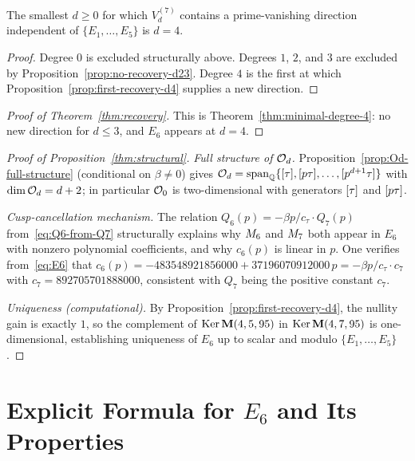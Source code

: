 \documentclass[11pt]{article}
\begin{document}
\begin{theorem}
\label{thm:minimal-degree-4}
The smallest $d\ge 0$ for which $V_d^{(7)}$ contains a prime-vanishing direction
independent of $\{E_1,\dots,E_5\}$ is $d=4$.
\end{theorem}

\begin{proof}
Degree $0$ is excluded structurally above.
Degrees $1$, $2$, and $3$ are excluded by Proposition~\ref{prop:no-recovery-d23}.
Degree $4$ is the first at which Proposition~\ref{prop:first-recovery-d4} supplies
a new direction.
\end{proof}

\begin{proof}[Proof of Theorem~\ref{thm:recovery}]
This is Theorem~\ref{thm:minimal-degree-4}: no new direction for $d\le 3$, and $E_6$
appears at $d=4$.
\end{proof}

\begin{proof}[Proof of Proposition~\ref{thm:structural}]
\textit{Full structure of $\mathcal{O}_d$.}
Proposition~\ref{prop:Od-full-structure} (conditional on $\beta\ne 0$) gives
$\mathcal{O}_d=\operatorname{span}_{\mathbb{Q}}\{[\tau],[p\tau],\dots,[p^{d+1}\tau]\}$ with $\dim\mathcal{O}_d=d+2$;
in particular $\mathcal{O}_0$ is two-dimensional with generators $[\tau]$ and $[p\tau]$.

\textit{Cusp-cancellation mechanism.}
The relation $Q_6(p) = -\beta p/c_\tau\cdot Q_7(p)$ from~\eqref{eq:Q6-from-Q7}
structurally explains why $M_{6}$ and $M_{7}$ both appear in $E_6$ with nonzero
polynomial coefficients, and why $c_6(p)$ is linear in $p$.
One verifies from~\eqref{eq:E6} that
$c_6(p) = -483548921856000 + 37196070912000\,p = -\beta p/c_\tau\cdot c_7$
with $c_7=892705701888000$, consistent with $Q_7$ being the positive constant $c_7$.

\textit{Uniqueness (computational).}
By Proposition~\ref{prop:first-recovery-d4}, the nullity gain is exactly $1$, so the
complement of $\operatorname{Ker}\mathbf{M}(4,5,95)$ in $\operatorname{Ker}\mathbf{M}(4,7,95)$ is one-dimensional,
establishing uniqueness of $E_6$ up to scalar and modulo $\{E_1,\dots,E_5\}$.
\end{proof}

\section{Explicit Formula for $E_6$ and Its Properties}
\label{sec:E6-formula}
\end{document}
